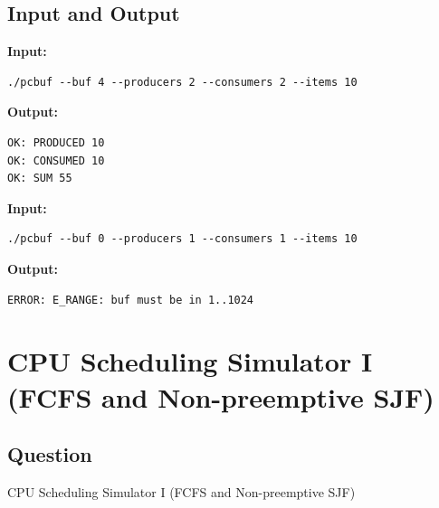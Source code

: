 \documentclass[12pt,a4paper]{article}
\begin{document}
\subsection{Input and Output}
\noindent\textbf{Input:}
\begin{verbatim}
./pcbuf --buf 4 --producers 2 --consumers 2 --items 10
\end{verbatim}
\vspace{0.5cm}
\noindent\textbf{Output:}
\begin{verbatim}
OK: PRODUCED 10
OK: CONSUMED 10
OK: SUM 55
\end{verbatim}
\noindent\textbf{Input:}
\begin{verbatim}
./pcbuf --buf 0 --producers 1 --consumers 1 --items 10

\end{verbatim}
\vspace{0.5cm}
\noindent\textbf{Output:}
\begin{verbatim}
ERROR: E_RANGE: buf must be in 1..1024

\end{verbatim}
\newpage
\section{CPU Scheduling Simulator I (FCFS and Non-preemptive SJF)}
\subsection{Question}
CPU Scheduling Simulator I (FCFS and Non-preemptive SJF)
\end{document}
